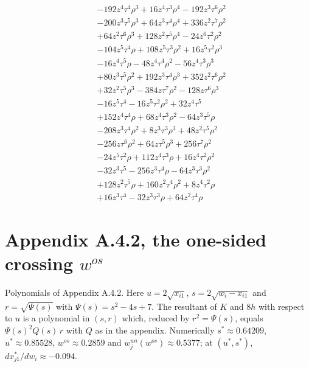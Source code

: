 {\begin{align*}
&-192z^{4} \tau^{4} \rho^{3}+16z^{4} \tau^{3} \rho^{4}-192z^{3} \tau^{6} \rho^{2}\\
&-200z^{3} \tau^{5} \rho^{3}+64z^{3} \tau^{4} \rho^{4}+336z^{2} \tau^{7} \rho^{2}\\
&+64z^{2} \tau^{6} \rho^{3}+128z^{2} \tau^{5} \rho^{4}-24z^{6} \tau^{2} \rho^{2}\\
&-104z^{5} \tau^{4} \rho+108z^{5} \tau^{3} \rho^{2}+16z^{5} \tau^{2} \rho^{3}\\
&-16z^{4} \tau^{5} \rho-48z^{4} \tau^{4} \rho^{2}-56z^{4} \tau^{3} \rho^{3}\\
&+80z^{3} \tau^{5} \rho^{2}+192z^{3} \tau^{4} \rho^{3}+352z^{2} \tau^{6} \rho^{2}\\
&+32z^{2} \tau^{5} \rho^{3}-384z \tau^{7} \rho^{2}-128z \tau^{6} \rho^{3}\\
&-16z^{5} \tau^{4}-16z^{5} \tau^{2} \rho^{2}+32z^{4} \tau^{5}\\
&+152z^{4} \tau^{4} \rho+68z^{4} \tau^{3} \rho^{2}-64z^{3} \tau^{5} \rho\\
&-208z^{3} \tau^{4} \rho^{2}+8z^{3} \tau^{3} \rho^{3}+48z^{2} \tau^{5} \rho^{2}\\
&-256z \tau^{6} \rho^{2}+64z \tau^{5} \rho^{3}+256\tau^{7} \rho^{2}\\
&-24z^{5} \tau^{2} \rho+112z^{4} \tau^{3} \rho+16z^{4} \tau^{2} \rho^{2}\\
&-32z^{3} \tau^{5}-256z^{3} \tau^{4} \rho-64z^{3} \tau^{3} \rho^{2}\\
&+128z^{2} \tau^{5} \rho+160z^{2} \tau^{4} \rho^{2}+8z^{4} \tau^{2} \rho\\
&+16z^{3} \tau^{4}-32z^{3} \tau^{3} \rho+64z^{2} \tau^{4} \rho
\end{align*}
}


\section*{Appendix A.4.2, the one-sided crossing $w^{os}$}
Polynomials of Appendix A.4.2. Here $u=2\sqrt{x_{i1}}$, $s=2\sqrt{w_i-x_{i1}}$ and $r=\sqrt{\Psi(s)}$ with $\Psi(s)=s^2-4s+7$. The resultant of $K$ and $8h$ with respect to $u$ is a polynomial in $(s,r)$ which, reduced by $r^2=\Psi(s)$, equals $\Psi(s)^2Q(s)\,r$ with $Q$ as in the appendix. Numerically $s^*\approx0.64209$, $u^*\approx0.85528$, $w^{os}\approx0.2859$ and $w_j^{un}(w^{os})\approx0.5377$; at $(u^*,s^*)$, $dx_{j1}^*/dw_i\approx-0.094$.

